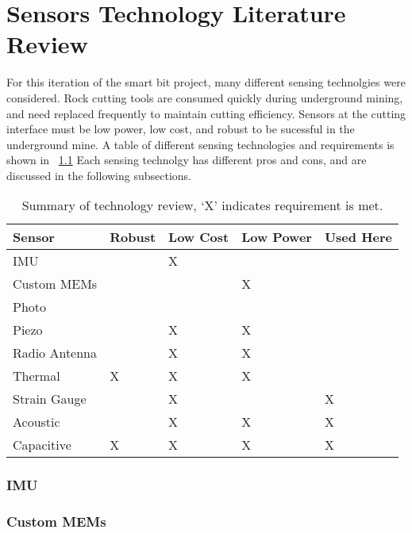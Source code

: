 \chapter{Sensors Technology Literature Review\label{chap:3}}

For this iteration of the smart bit project, many different sensing technolgies were considered.
Rock cutting tools are consumed quickly during underground mining, and need replaced frequently
to maintain cutting efficiency. 
Sensors at the cutting interface must be low power, low cost, and robust 
to be sucessful in the underground mine.
A table of different sensing technologies and requirements is shown in ~\ref{tab:sense_review}
Each sensing technolgy has different pros and cons, and are discussed in the following subsections.


\begin{table}[]
\centering
\caption{Summary of technology review, `X' indicates requirement is met.}
\label{tab:sense_review}
\begin{tabular}{|l|l|l|l|l|}
\hline
Sensor        & Robust & Low Cost & Low Power & Used Here \\ \hline
IMU           &        & X        &           &           \\ \hline
Custom MEMs   &        &          & X         &           \\ \hline
Photo         &        &          &           &           \\ \hline
Piezo         &        & X        & X         &           \\ \hline
Radio Antenna &        & X        & X         &           \\ \hline
Thermal       & X      & X        & X         &           \\ \hline
Strain Gauge  &        & X        &           & X         \\ \hline
Acoustic      &        & X        & X         & X         \\ \hline
Capacitive    & X      & X        & X         & X         \\ \hline
\end{tabular}
\end{table}

\subsection{IMU}

\subsection{Custom MEMs}

